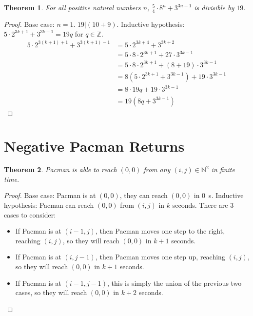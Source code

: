 \documentclass{article}
\newtheorem{theorem}{Theorem}
\newcommand{\N}{\mathbb{N}}
\newcommand{\Z}{\mathbb{Z}}
\begin{document}
\subsection{}

\begin{theorem}
    For all positive natural numbers \(n\), \(\frac{5}{4} \cdot 8^n + 3^{3n - 1}\) is divisible by \(19\).
\end{theorem}
\begin{proof}
    Base case: \(n = 1\). \(19 | (10 + 9)\).
    Inductive hypothesis: \(5 \cdot 2^{3k + 1} + 3^{3k - 1} = 19q\) for \(q \in \Z\).
    \begin{align}
        5 \cdot 2^{3 (k + 1) + 1} + 3^{3 (k + 1) - 1} &= 5 \cdot 2^{3k + 4} + 3^{3k + 2} \\
        &= 5 \cdot 8 \cdot 2^{3k + 1} + 27 \cdot 3^{3k - 1} \\
        &= 5 \cdot 8 \cdot 2^{3k + 1} + (8 + 19) \cdot 3^{3k - 1} \\
        &= 8 (5 \cdot 2^{3k + 1} + 3^{3k - 1}) + 19 \cdot 3^{3k - 1} \\
        &= 8 \cdot 19q + 19 \cdot 3^{3k - 1} \\
        &= 19 (8q + 3^{3k - 1})
    \end{align}
\end{proof}

\section{Negative Pacman Returns}

\begin{theorem}
    Pacman is able to reach \((0, 0)\) from any \((i, j) \in \N^2\) in finite time.
\end{theorem}
\begin{proof}
    Base case: Pacman is at \((0, 0)\), they can reach \((0, 0)\) in \SI{0}{\second}.
    Inductive hypothesis: Pacman can reach \((0, 0)\) from \((i, j)\) in \(k\) seconds.
    There are 3 cases to consider:
    \begin{itemize}
        \item If Pacman is at \((i - 1, j)\), then Pacman moves one step to the right, reaching \((i, j)\), so they will reach \((0, 0)\) in \(k + 1\) seconds.
        \item If Pacman is at \((i, j - 1)\), then Pacman moves one step up, reaching \((i, j)\), so they will reach \((0, 0)\) in \(k + 1\) seconds.
        \item If Pacman is at \((i - 1, j - 1)\), this is simply the union of the previous two cases, so they will reach \((0, 0)\) in \(k + 2\) seconds.
    \end{itemize}
\end{proof}
\end{document}
